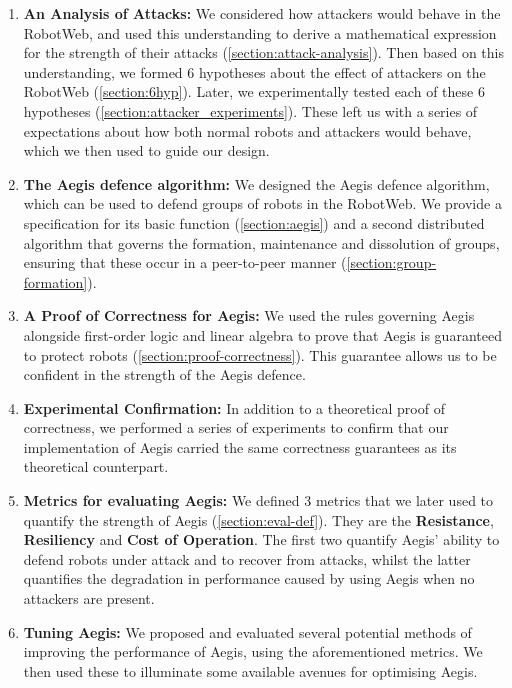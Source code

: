 \begin{enumerate}
    \item \textbf{An Analysis of Attacks: } We considered how attackers would behave in the RobotWeb, and used this understanding to derive a mathematical expression for the strength of their attacks (\autoref{section:attack-analysis}). Then based on this understanding, we formed 6 hypotheses about the effect of attackers on the RobotWeb (\autoref{section:6hyp}). Later, we experimentally tested each of these 6 hypotheses (\autoref{section:attacker_experiments}). These left us with a series of expectations about how both normal robots and attackers would behave, which we then used to guide our design.
    \item \textbf{The Aegis defence algorithm: } We designed the Aegis defence algorithm, which can be used to defend groups of robots in the RobotWeb. We provide a specification for its basic function (\autoref{section:aegis}) and a second distributed algorithm that governs the formation, maintenance and dissolution of groups, ensuring that these occur in a peer-to-peer manner (\autoref{section:group-formation}). 
    \item \textbf{A Proof of Correctness for Aegis:} We used the rules governing Aegis alongside first-order logic and linear algebra to prove that Aegis is guaranteed to protect robots (\autoref{section:proof-correctness}). This guarantee allows us to be confident in the strength of the Aegis defence.
    \item \textbf{Experimental Confirmation:} In addition to a theoretical proof of correctness, we performed a series of experiments to confirm that our implementation of Aegis carried the same correctness guarantees as its theoretical counterpart.
    \item \textbf{Metrics for evaluating Aegis: } We defined 3 metrics that we later used to quantify the strength of Aegis (\autoref{section:eval-def}). They are the \textbf{Resistance}, \textbf{Resiliency} and \textbf{Cost of Operation}. The first two quantify Aegis' ability to defend robots under attack and to recover from attacks, whilst the latter quantifies the degradation in performance caused by using Aegis when no attackers are present.
    \item \textbf{Tuning Aegis:} We proposed and evaluated several potential methods of improving the performance of Aegis, using the aforementioned metrics. We then used these to illuminate some available avenues for optimising Aegis.
\end{enumerate}

